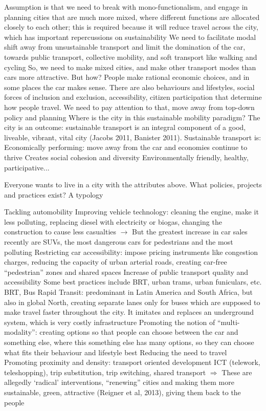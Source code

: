 \documentclass{article}
\begin{document}
\begin{outline}
	\1 Assumption is that we need to break with mono-functionalism, and engage in planning cities that are much more mixed, where different functions are allocated closely to each other; this is required because it will reduce travel across the city, which has important repercussions on sustainability
	\1 We need to facilitate modal shift away from unsustainable transport and limit the domination of the car, towards public transport, collective mobility, and soft transport like walking and cycling
	\1 So, we need to make mixed cities, and make other transport modes than cars more attractive. But how?
	\1 People make rational economic choices, and in some places the car makes sense. There are also behaviours and lifestyles, social forces of inclusion and exclusion, accessibility, citizen participation that determine how people travel. We need to pay attention to that, move away from top-down policy and planning
	\1 Where is the city in this sustainable mobility paradigm?
		\2 The city is an outcome: sustainable transport is an integral component of a good, liveable, vibrant, vital city (Jacobs 2011, Banister 2011). Sustainable transport is:
		\2 Economically performing: move away from the car and economies continue to thrive
		\2 Creates social cohesion and diversity
		\2 Environmentally friendly, healthy, participative... 
\end{outline}

Everyone wants to live in a city with the attributes above. What policies, projects and practices exist? A typology

\begin{outline}
	\1 Tackling automobility
		\2 Improving vehicle technology: cleaning the engine, make it less polluting, replacing diesel with electricity or biogas, changing the construction to cause less casualties $\rightarrow$ But the greatest increase in car sales recently are SUVs, the most dangerous cars for pedestrians and the most polluting
		\2 Restricting car accessibility: impose pricing instruments like congestion charges, reducing the capacity of urban arterial roads, creating car-free ``pedestrian'' zones and shared spaces
		\2 Increase of public transport quality and accessibility
			\3 Some best practices include BRT, urban trams, urban funiculars, etc.
			\3 BRT, Bus Rapid Transit: predominant in Latin America and South Africa, but also in global North, creating separate lanes only for buses which are supposed to make travel faster throughout the city. It imitates and replaces an underground system, which is very costly infrastructure
		\2  Promoting the notion of ``multi-modality'': creating options so that people can choose between the car and something else, where this something else has many options, so they can choose what fits their behaviour and lifestyle best
	\1 Reducing the need to travel
		\2 Promoting proximity and density: transport oriented development
		\2 ICT (telework, teleshopping), trip substitution, trip switching, shared transport
		\2 $\Rightarrow$ These are allegedly `radical' interventions, ``renewing'' cities and making them more sustainable, green, attractive (Reigner et al, 2013), giving them back to the people
\end{outline}
\end{document}
